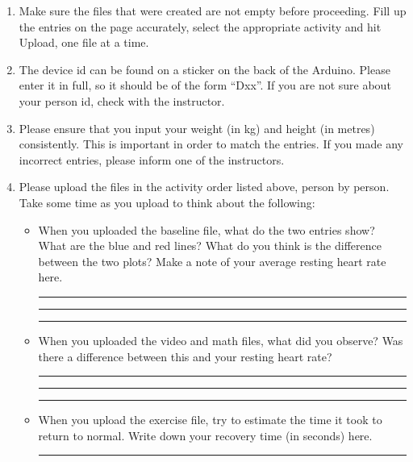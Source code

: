 \documentclass[11pt]{article}
\providecommand{\tightlist}{%
  \setlength{\itemsep}{0pt}\setlength{\parskip}{0pt}}
\begin{document}
\begin{enumerate}
\def\labelenumi{\arabic{enumi}.}
\setcounter{enumi}{1}
\tightlist
\item
  Make sure the files that were created are not empty before proceeding.
  Fill up the entries on the page accurately, select the appropriate activity and
  hit Upload, one file at a time.
\item
  The device id can be found on a sticker on the back of the Arduino.
  Please enter it in full, so it should be of the form ``Dxx''. If you are not
  sure about your person id, check with the instructor.
\item
  Please ensure that you input your weight (in kg) and height (in metres) 
  consistently. This
  is important in order to match the entries. If you made any incorrect
  entries, please inform one of the instructors.
\item
  Please upload the files in the activity order listed above, person by
  person. Take some time as you upload to think about the following:
\begin{itemize}
\item 
When you uploaded the baseline file, what do the two entries show? What
are the blue and red lines? What do you think is the difference between
the two plots? Make a note of your average resting heart rate here.

\vspace{1.5em}
\rule{16cm}{0.5pt}

\vspace{1.5em}
\rule{16cm}{0.5pt}

\vspace{1.5em}
\rule{16cm}{0.5pt}

\item 
When you uploaded the video and math files, what did you observe? Was
there a difference between this and your resting heart rate?

\vspace{1.5em}
\rule{16cm}{0.5pt}

\vspace{1.5em}
\rule{16cm}{0.5pt}

\vspace{1.5em}
\rule{16cm}{0.5pt}

\item 
When you upload the exercise file, try to estimate the time it took to
return to normal. Write down your recovery time (in seconds) here.

\vspace{1.5em}
\rule{16cm}{0.5pt}


\end{itemize}
\end{enumerate}
\end{document}
